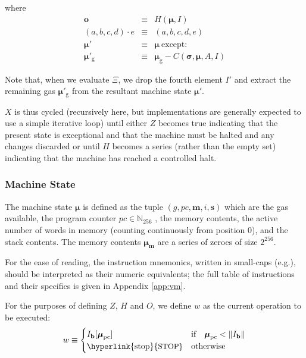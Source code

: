 \documentclass[9pt,oneside]{amsart}
\makeatletter
\newcommand*\eg{e.g.\@\xspace}
\makeatother
\begin{document}
\begin{multicols}{2}
where
\begin{eqnarray}
\mathbf{o} & \equiv & H(\boldsymbol{\mu}, I) \\
(a, b, c, d) \cdot e & \equiv & (a, b, c, d, e) \\
\boldsymbol{\mu}' & \equiv & \boldsymbol{\mu}\ \text{except:} \\
\boldsymbol{\mu}'_{\mathrm{g}} & \equiv & \boldsymbol{\mu}_{\mathrm{g}} - C(\boldsymbol{\sigma}, \boldsymbol{\mu}, A, I)
\end{eqnarray}

Note that, when we evaluate $\Xi$, we drop the fourth element $I'$ and extract the remaining gas $\boldsymbol{\mu}'_{\mathrm{g}}$ from the resultant machine state $\boldsymbol{\mu}'$.

$X$ is thus cycled (recursively here, but implementations are generally expected to use a simple iterative loop) until either \hyperlink{zhalt}{$Z$} becomes true indicating that the present state is exceptional and that the machine must be halted and any changes discarded or until \hyperlink{hhalt}{$H$} becomes a series (rather than the empty set) indicating that the machine has reached a controlled halt.

\subsubsection{Machine State}
The machine state $\boldsymbol{\mu}$ is defined as the tuple $(g, pc, \mathbf{m}, i, \mathbf{s})$ which are the gas available, the program counter $pc \in \mathbb{N}_{256}$ , the memory contents, the active number of words in memory (counting continuously from position 0), and the stack contents. The memory contents $\boldsymbol{\mu}_{\mathbf{m}}$ are a series of zeroes of size $2^{256}$.

For the ease of reading, the instruction mnemonics, written in small-caps (\eg {}), should be interpreted as their numeric equivalents; the full table of instructions and their specifics is given in Appendix \ref{app:vm}.

For the purposes of defining $Z$, $H$ and $O$, we define $w$ as the current operation to be executed:
\begin{equation}\label{eq:currentoperation}
w \equiv \begin{cases} I_{\mathbf{b}}[\boldsymbol{\mu}_{\mathrm{pc}}] & \text{if} \quad \boldsymbol{\mu}_{\mathrm{pc}} < \lVert I_{\mathbf{b}} \rVert \\
\text{\hyperlink{stop}{\small STOP}} & \text{otherwise}
\end{cases}
\end{equation}


\end{multicols}
\end{document}
